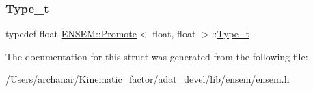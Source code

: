 \subsubsection{\texorpdfstring{Type\_t}{Type\_t}\hspace{0.1cm}{\footnotesize\ttfamily [2/2]}}
{\footnotesize\ttfamily typedef float \mbox{\hyperlink{structENSEM_1_1Promote}{E\+N\+S\+E\+M\+::\+Promote}}$<$ float, float $>$\+::\mbox{\hyperlink{structENSEM_1_1Promote_3_01float_00_01float_01_4_a27610700459f91acb939a75fd84c4d76}{Type\+\_\+t}}}



The documentation for this struct was generated from the following file\+:\begin{DoxyCompactItemize}
\item 
/\+Users/archanar/\+Kinematic\+\_\+factor/adat\+\_\+devel/lib/ensem/\mbox{\hyperlink{lib_2ensem_2ensem_8h}{ensem.\+h}}\end{DoxyCompactItemize}
